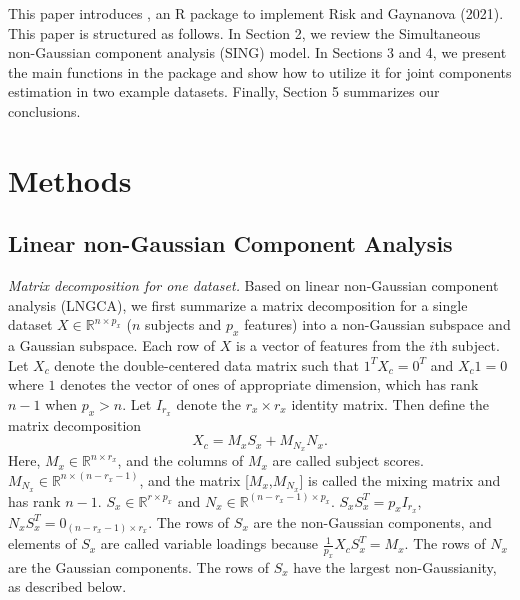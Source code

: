 This paper introduces , an R package to implement Risk and Gaynanova (2021). This paper is structured as follows. In Section 2, we review the Simultaneous non-Gaussian component analysis (SING) model. In Sections 3 and 4, we present the main functions in the  package and show how to utilize it for joint components estimation in two example datasets. Finally, Section 5 summarizes our conclusions.

\hypertarget{methods}{%
\section{Methods}\label{methods}}

\hypertarget{linear-non-gaussian-component-analysis}{%
\subsection{Linear non-Gaussian Component Analysis}\label{linear-non-gaussian-component-analysis}}

\emph{Matrix decomposition for one dataset.} Based on linear non-Gaussian component analysis (LNGCA), we first summarize a matrix decomposition for a single dataset \(X\in \mathbb{R} ^{n\times p_{x}}\) (\(n\) subjects and \(p_{x}\) features) into a non-Gaussian subspace and a Gaussian subspace.
Each row of \(X\) is a vector of features from the \(i\)th subject. Let \(X_{c}\) denote the double-centered data matrix such that \(1^{T}X_{c}=0^{T}\) and \(X_{c}1=0\) where \(1\) denotes the vector of ones of appropriate dimension, which has rank \(n-1\) when \(p_{x}>n\). Let \(I_{r_{x}}\) denote the \(r_{x}\times r_{x}\) identity matrix. Then define the matrix decomposition
\begin{equation}
X_{c}=M_{x}S_{x}+M_{N_{x}}N_{x}.
\label{eq:decomp}
\end{equation}
Here, \(M_{x}\in \mathbb{R}^{n\times r_{x}}\), and the columns of \(M_{x}\) are called subject scores. \(M_{N_{x}}\in \mathbb{R}^{n\times (n-r_{x}-1)}\), and the matrix {[}\(M_{x}\),\(M_{N_{x}}\){]} is called the mixing matrix and has rank \(n-1\). \(S_{x} \in \mathbb{R}^{r \times p_{x}}\) and \(N_{x} \in \mathbb{R}^{(n-r_{x}-1) \times p_{x}}\). \(S_{x}S_{x}^{T}=p_{x}I_{r_{x}}\), \(N_{x}S_{x}^{T}=0_{(n-r_{x}-1)\times r_{x}}\). The rows of \(S_{x}\) are the non-Gaussian components, and elements of \(S_{x}\) are called variable loadings because \(\frac{1}{p_x} X_{c}S_{x}^{T}=M_{x}\). The rows of \(N_{x}\) are the Gaussian components. The rows of \(S_{x}\) have the largest non-Gaussianity, as described below.

